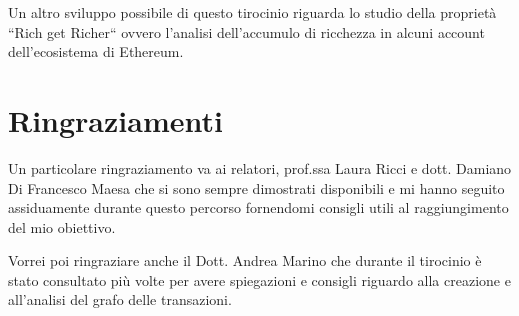 \documentclass[12pt]{report}
\begin{document}
Un altro sviluppo possibile di questo tirocinio riguarda lo studio della proprietà ``Rich get Richer`` ovvero l'analisi dell'accumulo di ricchezza in alcuni account dell'ecosistema di Ethereum.


\chapter{Ringraziamenti}

Un particolare ringraziamento va ai relatori, prof.ssa Laura Ricci e dott. Damiano Di Francesco Maesa che si sono sempre dimostrati disponibili e mi hanno seguito assiduamente durante questo percorso fornendomi consigli utili al raggiungimento del mio obiettivo.

Vorrei poi ringraziare anche il Dott. Andrea Marino che durante il tirocinio è stato consultato più volte per avere spiegazioni e consigli riguardo alla creazione e all'analisi del grafo delle transazioni.

\appendix




\end{document}
